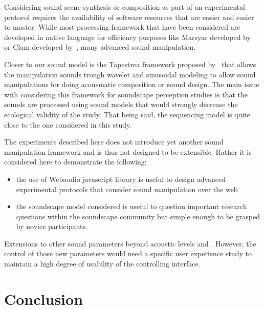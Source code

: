 \documentclass[12pt]{elsarticle}
\begin{document}
Considering sound scene synthesis or composition as part of an experimental protocol requires the availability of software resources that are easier and easier to master. While most processing framework that have been considered are developed in native language for efficiency purposes like Marsyas developed by~\cite{tzanetakis2000marsyas} or Clam developed by~\cite{amatriain2006clam}, many advanced sound manipulation.

Closer to our sound model is the Tapestrea framework proposed by~\cite{misra2007musical} that allows the manipulation sounds trough wavelet and sinusoidal modeling to allow sound manipulations for doing acousmatic composition or sound
design. The main issue with considering this framework for soundscape perception studies is that the sounds are processed using sound models that would strongly decrease the ecological validity of the study. That being said, the sequencing model is quite close to the one considered in this study.

The experiments described here does not introduce yet another sound manipulation framework and is thus not designed to be extensible. Rather it is considered here to demonstrate the following:
\begin{itemize}
  \item the use of Webaudio javascript library is useful to design advanced experimental protocols that consider sound manipulation over the web
  \item the soundscape model considered is useful to question important research questions within the soundscape community  but simple enough to be grasped by novice participants.
\end{itemize}

Extensions to other sound parameters beyond acoustic levels and . However, the control of those new parameters would need a specific user experience study to maintain a high degree of usability of the controlling interface.









\section{Conclusion}

\end{document}
